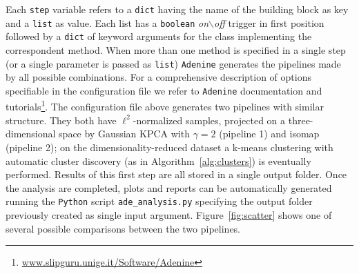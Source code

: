 \documentclass[twoside,11pt]{article}
\makeatletter
\newcommand{\ade}{\texttt{Adenine}\@\xspace}
\newcommand{\py}{\texttt{Python}\@\xspace}
\makeatother
\begin{document}
\noindent Each \texttt{step} variable refers to a \texttt{dict} having the name of the building block as key and a \texttt{list} as value. Each list has a \texttt{boolean} \emph{on$\backslash$off} trigger in first position followed by a \texttt{dict} of keyword arguments for the class implementing the correspondent method. When more than one method is specified in a single step (or a single parameter is passed as \texttt{list}) \ade generates the pipelines made by all possible combinations. 
For a comprehensive description of options specifiable in the configuration file we refer to \ade documentation and tutorials\footnote{\url{www.slipguru.unige.it/Software/Adenine}}.
The configuration file above generates two pipelines with similar structure. They both have $\ell^2$-normalized samples, projected on a three-dimensional space by Gaussian KPCA with $\gamma=2$ (pipeline 1) and isomap (pipeline 2); on the dimensionality-reduced dataset a k-means clustering with automatic cluster discovery (as in Algorithm~\ref{alg:clusters}) is eventually performed.
Results of this first step are all stored in a single output folder. Once the analysis are completed, plots and reports can be automatically generated running the \py script \texttt{ade\_analysis.py} specifying the output folder previously created as single input argument. Figure~\ref{fig:scatter} shows one of several possible comparisons between the two pipelines.
\end{document}
